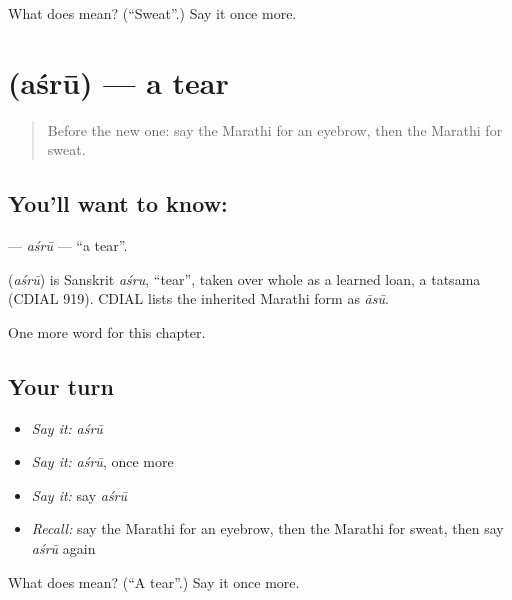 \begin{tcolorbox}[breakable,colback=teal!4,colframe=teal!35!black,title={Before you move on}]
What does  mean? (\textquotedblleft{}Sweat\textquotedblright{}.) Say it once more.
\end{tcolorbox}
\section[\texorpdfstring{\mr{अश्रू} (aśrū)}{अश्रू (aśrū)}]{ (aśrū) — a tear}

\label{lesson:MR-C220-asru}



\begin{quote}
Before the new one: say the Marathi for an eyebrow, then the Marathi for sweat.
\end{quote}

\subsection*{You'll want to know: }
\textbf{} — \emph{aśrū} — \textquotedblleft{}a tear\textquotedblright{}.

\begin{cousinweb}
\textbf{} (\emph{aśrū}) is Sanskrit \emph{aśru}, \textquotedblleft{}tear\textquotedblright{}, taken over whole as a learned loan, a tatsama (CDIAL 919). CDIAL lists the inherited Marathi form as \emph{āsū}.
\end{cousinweb}

\begin{grammarlens}[title={What you've built}]
One more word for this chapter.
\end{grammarlens}

\subsection*{Your turn}
\begin{itemize}
\raggedright
  \item \emph{Say it:} \emph{aśrū}
  \item \emph{Say it:} \emph{aśrū}, once more
  \item \emph{Say it:} say \emph{aśrū}
  \item \emph{Recall:} say the Marathi for an eyebrow, then the Marathi for sweat, then say \emph{aśrū} again
\end{itemize}

\begin{tcolorbox}[breakable,colback=teal!4,colframe=teal!35!black,title={Before you move on}]
What does  mean? (\textquotedblleft{}A tear\textquotedblright{}.) Say it once more.
\end{tcolorbox}
